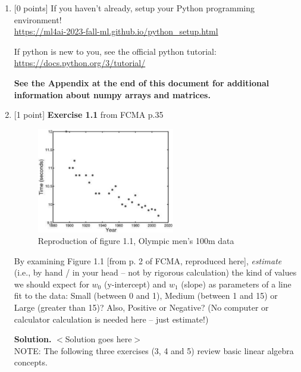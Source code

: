\documentclass[10pt]{article}
\begin{document}
\begin{enumerate}


\item \label{prob:1} [0 points]
If you haven't already, setup your Python programming environment! \\
\url{https://ml4ai-2023-fall-ml.github.io/python_setup.html}

If python is new to you, see the official python tutorial:\\
\url{https://docs.python.org/3/tutorial/}

{\bf See the Appendix at the end of this document for additional information about numpy arrays and matrices.}

\vspace{0.5cm}


\item \label{prob:2} [1 point]
{\bf Exercise 1.1} from FCMA p.35

\begin{figure}[htb]
\begin{center}
\includegraphics[width=6cm]{figures/figure1-1_p2}
\caption{Reproduction of figure 1.1, Olympic men's 100m data}
\end{center}
\end{figure}
By examining Figure 1.1 [from p. 2 of FCMA, reproduced here], {\em estimate} (i.e., by hand / in your head -- not by rigorous calculation) the kind of values we should expect for $w_0$ (y-intercept) and $w_1$ (slope) as parameters of a line fit to the data: Small (between 0 and 1), Medium (between 1 and 15) or Large (greater than 15)? Also, Positive or Negative?  (No computer or calculator calculation is needed here -- just estimate!)

{\bf Solution.} $<$Solution goes here$>$\\



\newpage
NOTE: The following three exercises (3, 4 and 5) review basic linear algebra concepts.


\end{enumerate}
\end{document}
